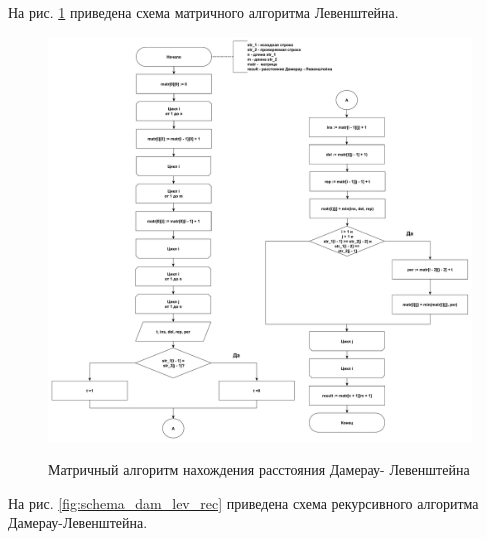 \documentclass[a4paper,12pt]{article}
\begin{document}
        На рис. \ref{fig:schema_dam_lev_matr} приведена схема матричного алгоритма 				Левенштейна.
        
        \begin{figure}[h!]
        	\begin{center}
        		{\includegraphics[width = \textwidth]{schema01.pdf}}
        		\caption{Матричный алгоритм нахождения расстояния Дамерау-								Левенштейна}
        		\label{fig:schema_dam_lev_matr}
        	\end{center}
        \end{figure}
    

	    На рис. \ref{fig:schema_dam_lev_rec} приведена схема рекурсивного алгоритма 			Дамерау-Левенштейна.
	    
\end{document}
